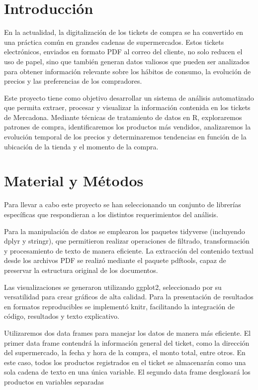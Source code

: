 \documentclass[,article,submit,moreauthors,pdftex]{Definitions/mdpi}
\begin{document}

\hypertarget{introducciuxf3n}{%
\section{Introducción}\label{introducciuxf3n}}

En la actualidad, la digitalización de los tickets de compra se ha
convertido en una práctica común en grandes cadenas de supermercados.
Estos tickets electrónicos, enviados en formato PDF al correo del
cliente, no solo reducen el uso de papel, sino que también generan datos
valiosos que pueden ser analizados para obtener información relevante
sobre los hábitos de consumo, la evolución de precios y las preferencias
de los compradores.

Este proyecto tiene como objetivo desarrollar un sistema de análisis
automatizado que permita extraer, procesar y visualizar la información
contenida en los tickets de Mercadona. Mediante técnicas de tratamiento
de datos en R, exploraremos patrones de compra, identificaremos los
productos más vendidos, analizaremos la evolución temporal de los
precios y determinaremos tendencias en función de la ubicación de la
tienda y el momento de la compra.

\hypertarget{material-y-muxe9todos}{%
\section{Material y Métodos}\label{material-y-muxe9todos}}

Para llevar a cabo este proyecto se han seleccionando un conjunto de
librerías específicas que respondieran a los distintos requerimientos
del análisis.

Para la manipulación de datos se emplearon los paquetes tidyverse
(incluyendo dplyr y stringr), que permitieron realizar operaciones de
filtrado, transformación y procesamiento de texto de manera eficiente.
La extracción del contenido textual desde los archivos PDF se realizó
mediante el paquete pdftools, capaz de preservar la estructura original
de los documentos.

Las visualizaciones se generaron utilizando ggplot2, seleccionado por su
versatilidad para crear gráficos de alta calidad. Para la presentación
de resultados en formatos reproducibles se implementó knitr, facilitando
la integración de código, resultados y texto explicativo.

Utilizaremos dos data frames para manejar los datos de manera más
eficiente. El primer data frame contendrá la información general del
ticket, como la dirección del supermercado, la fecha y hora de la
compra, el monto total, entre otros. En este caso, todos los productos
registrados en el ticket se almacenarán como una sola cadena de texto en
una única variable. El segundo data frame desglosará los productos en
variables separadas
\end{document}
